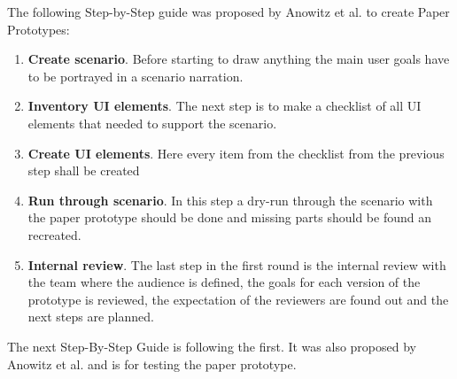 The following Step-by-Step guide was proposed by Anowitz et al. \cite{arnowitz2010effective} to create Paper Prototypes:

\begin{enumerate}
	\item \textbf{Create scenario}. Before starting to draw anything the main user goals have to be portrayed in a scenario narration.
	\item \textbf{Inventory UI elements}. The next step is to make a checklist of all UI elements that needed to support the scenario.
	\item \textbf{Create UI elements}. Here every item from the checklist from the previous step shall be created
	\item \textbf{Run through scenario}.
	In this step a dry-run through the scenario with the paper prototype should be done and missing parts should be found an recreated.
	\item \textbf{Internal review}. The last step in the first round is the internal review with the team where the audience is defined, the goals for each version of the prototype is reviewed, the expectation of the reviewers are found out and the next steps are planned.
\end{enumerate}

The next Step-By-Step Guide is following the first. It was also proposed by Anowitz et al. \cite{arnowitz2010effective} and is for testing the paper prototype.

